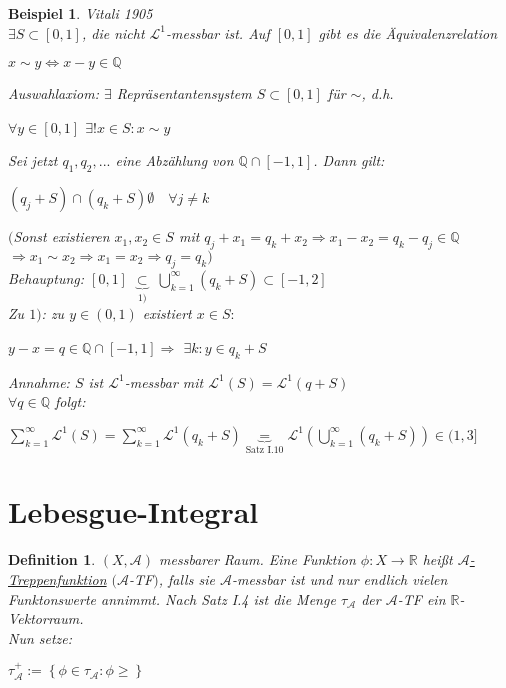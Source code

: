 \documentclass[11pt]{memoir}
\theoremstyle{changebreak}
\newtheorem{Definition}{Definition}[chapter]
\newtheorem{Beispiel}{Beispiel}[chapter]
\begin{document}
\begin{Beispiel}
\emph{Vitali 1905} \\
$\exists S \subset [0, 1]$, die nicht $\mathscr L^1$-messbar ist. Auf $[0, 1]$ gibt es die Äquivalenzrelation
\begin{center}
	$x \sim y \Leftrightarrow x - y \in \mathbb Q$
\end{center}
Auswahlaxiom: $\exists$ Repräsentantensystem $S \subset [0, 1]$ für $\sim$, d.h. 
\begin{center}
	$\forall y \in [0, 1]$ $\exists! x \in S: x \sim y$ 
\end{center}
Sei jetzt $q_1, q_2, ...$ eine Abzählung von $\mathbb Q \cap [-1, 1]$. Dann gilt: 
\begin{center}
	$(q_j + S) \cap (q_k +S)  \emptyset \quad \forall j \ne k$ 
\end{center}
$($Sonst existieren $x_1, x_2 \in S$ mit $q_j +x_1 = q_k + x_2 \Rightarrow x_1-x_2 = q_k -q_j \in \mathbb Q$
$ \Rightarrow x_1 \sim x_2  \Rightarrow x_1 = x_2 \Rightarrow q_j = q_k $\blitzd $ )$ \\

\emph{Behauptung:} $[0, 1]$ $\underbrace{\subset}_{1)}$ $\bigcup\limits_{k=1}^\infty
 (q_k + S) \subset [-1, 2]$ \\
 Zu $1)$: zu $y \in (0, 1)$ existiert $x \in S: $
 \begin{center}
	 $y - x = q \in \mathbb Q \cap [-1, 1] \Rightarrow$ $\exists k: y \in q_k + S$ 
\end{center}

\emph{Annahme:} $S$ ist $\mathscr L^1$-messbar mit $\mathscr L^1(S) = \mathscr L^1(q + S)$\\
$\forall q \in \mathbb Q$ folgt: 
\begin{center}
	$\sum\limits_{k=1}^\infty \mathscr L^1(S) = \sum\limits_{k=1}^\infty \mathscr L^1(q_k + S) \underbrace{=}_ {\text{Satz I.10}} \mathscr L^1\left(\bigcup\limits_{k=1}^\infty (q_k + S) \right) \in (1, 3]$ \blitzd
\end{center}
\end{Beispiel}



\section{Lebesgue-Integral}
\begin{Definition}
$(X, \mathscr A)$ messbarer Raum. Eine Funktion $\phi: X \rightarrow \mathbb R$ heißt \underline{$\mathscr A$-Treppenfunktion} $(\mathscr A$-TF$)$, falls sie $\mathscr A$-messbar ist und nur endlich vielen Funktonswerte annimmt. Nach Satz I.4 ist die Menge $\tau_ \mathscr A$ der $\mathscr A$-TF ein $\mathbb R$-Vektorraum. \\
Nun setze: 
\begin{center}
	$\tau_\mathscr A^+ := \left\{\phi\in \tau_\mathscr A: \phi \geq\right\}$
\end{center}
\end{Definition}
\end{document}
